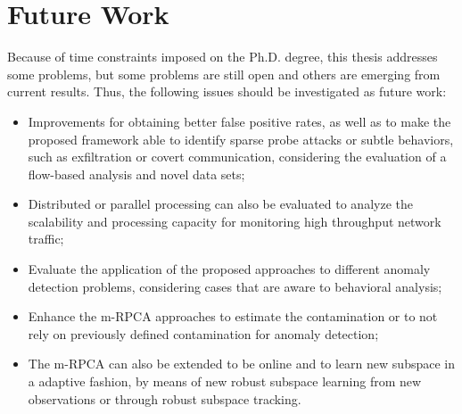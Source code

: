 \section{Future Work}
\label{sc:conc_futurework}

Because of time constraints imposed on the Ph.D. degree, this thesis addresses some problems, but some problems are still open and others are emerging from current results. Thus, the following issues should be investigated as future work:

\begin{itemize}
	\item Improvements for obtaining better false positive rates, as well as to make the proposed framework able to identify sparse probe attacks or subtle behaviors, such as exfiltration or covert communication, considering the evaluation of a flow-based analysis and novel data sets;
	\item Distributed or parallel processing can also be evaluated to analyze the scalability and processing capacity for monitoring high throughput network traffic;
	\item Evaluate the application of the proposed approaches to different anomaly detection problems, considering cases that are aware to behavioral analysis;
	\item Enhance the m-RPCA approaches to estimate the contamination or to not rely on previously defined contamination for anomaly detection;
	\item The m-RPCA can also be extended to be online and to learn new subspace in a adaptive fashion, by means of new robust subspace learning from new observations or through robust subspace tracking.
\end{itemize}